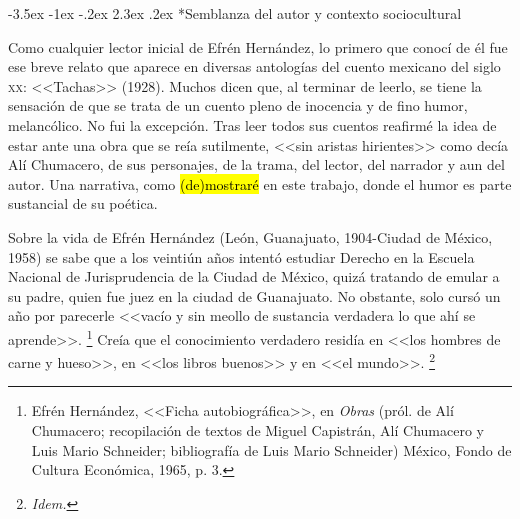 \documentclass[14pt,twoside,final]{extbook} %
\makeatletter
\let\oldfootnote\footnote
\renewcommand\footnote[1]{%
\oldfootnote{\hspace{1mm}#1}}
\renewcommand\section{\@startsection {section}{1}{\z@}%
                                     {-3.5ex \@plus -1ex \@minus -.2ex}%
                                     {2.3ex \@plus .2ex}%
                                     {\normalfont\large\bfseries\sc}}
\makeatother
\begin{document}
\section*{Semblanza del autor y contexto sociocultural}\label{sec:semblanza-del-autor-y-contexto-sociocultural}
Como cualquier lector inicial de Efrén Hernández, lo primero que conocí de él fue ese breve relato que aparece en diversas antologías del cuento mexicano del siglo \textsc{xx}: <<Tachas>> (1928). Muchos dicen que, al terminar de leerlo, se tiene la sensación de que se trata de un cuento pleno de inocencia y de fino humor, melancólico. No fui la excepción. Tras leer todos sus cuentos reafirmé la idea de estar ante una obra que se reía sutilmente, <<sin aristas hirientes>> como decía Alí Chumacero, de sus personajes, de la trama, del lector, del narrador y aun del autor. Una narrativa, como \hl{(de)mostraré} en este trabajo, donde el humor es parte sustancial de su poética.

Sobre la vida de Efrén Hernández (León, Guanajuato, 1904-Ciudad de México, 1958) se sabe que a los veintiún años intentó estudiar Derecho en la Escuela Nacional de Jurisprudencia de la Ciudad de México, quizá tratando de emular a su padre, quien fue juez en la ciudad de Guanajuato. No obstante, solo cursó un año por parecerle <<vacío y sin meollo de sustancia verdadera lo que ahí se aprende>>.\footnote{Efrén Hernández, <<Ficha autobiográfica>>, en \emph{Obras} (pról. de Alí Chumacero; recopilación de textos de Miguel Capistrán, Alí Chumacero y Luis Mario Schneider; bibliografía de Luis Mario Schneider) México, Fondo de Cultura Económica, 1965, p. 3.} Creía que el conocimiento verdadero residía en <<los hombres de carne y hueso>>, en <<los libros buenos>> y en <<el mundo>>.\footnote{\emph{Idem.}}
\end{document}
